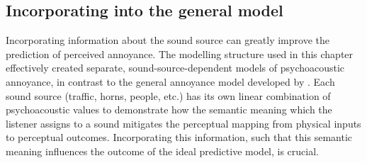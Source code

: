


\subsection{Incorporating into the general model}
Incorporating information about the sound source can greatly improve the prediction of perceived annoyance. The modelling structure used in this chapter effectively created separate, sound-source-dependent models of psychoacoustic annoyance, in contrast to the general annoyance model developed by \citet{PsychoacousticsfactsmodelsZwicker}. Each sound source (traffic, horns, people, etc.) has its own linear combination of psychoacoustic values to demonstrate how the semantic meaning which the listener assigns to a sound mitigates the perceptual mapping from physical inputs to perceptual outcomes. Incorporating this information, such that this semantic meaning influences the outcome of the ideal predictive model, is crucial. 

